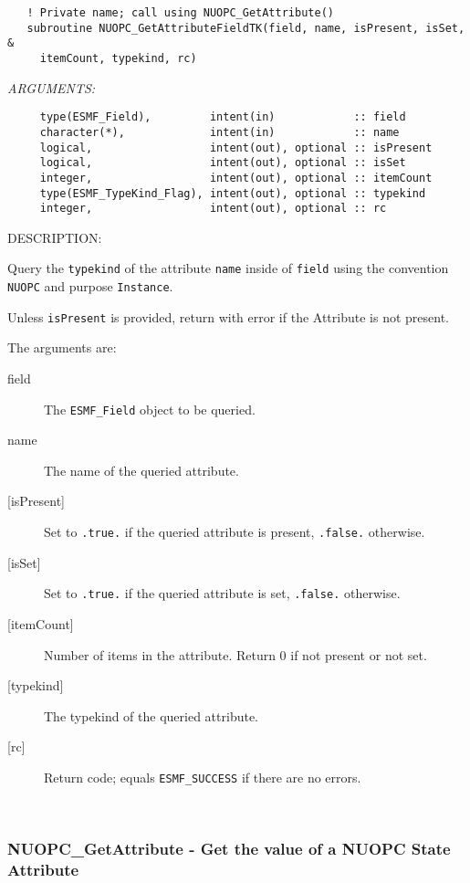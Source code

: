 \begin{verbatim}   ! Private name; call using NUOPC_GetAttribute()
   subroutine NUOPC_GetAttributeFieldTK(field, name, isPresent, isSet, &
     itemCount, typekind, rc)\end{verbatim}{\em ARGUMENTS:}
\begin{verbatim}     type(ESMF_Field),         intent(in)            :: field
     character(*),             intent(in)            :: name
     logical,                  intent(out), optional :: isPresent
     logical,                  intent(out), optional :: isSet
     integer,                  intent(out), optional :: itemCount
     type(ESMF_TypeKind_Flag), intent(out), optional :: typekind
     integer,                  intent(out), optional :: rc\end{verbatim}
{\sf DESCRIPTION:\\ }


     Query the {\tt typekind} of the attribute {\tt name} inside of {\tt field}
     using the convention {\tt NUOPC} and purpose {\tt Instance}.
  
     Unless {\tt isPresent} is provided, return with error if the Attribute is
     not present.
  
     The arguments are:
     \begin{description}
     \item[field]
       The {\tt ESMF\_Field} object to be queried.
     \item[name]
       The name of the queried attribute.
     \item[{[isPresent]}]
       Set to {\tt .true.} if the queried attribute is present, {\tt .false.}
       otherwise.
     \item[{[isSet]}]
       Set to {\tt .true.} if the queried attribute is set, {\tt .false.}
       otherwise.
     \item[{[itemCount]}]
       Number of items in the attribute. Return 0 if not present or not set.
     \item[{[typekind]}]
       The typekind of the queried attribute.
     \item[{[rc]}]
       Return code; equals {\tt ESMF\_SUCCESS} if there are no errors.
     \end{description}
   
 
\mbox{}\hrulefill\ 
 
\subsubsection [NUOPC\_GetAttribute] {NUOPC\_GetAttribute - Get the value of a NUOPC State Attribute}


